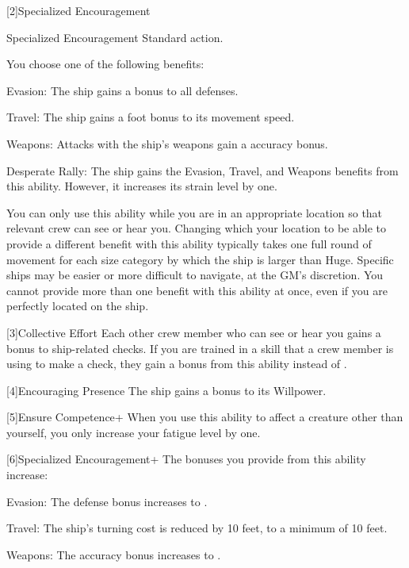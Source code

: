     [2]{Specialized Encouragement}
      \begin{activeability}{Specialized Encouragement}
        \abilityusagetime Standard action.
        \rankline

        You choose one of the following benefits:
        \begin{raggeditemize}
          \item Evasion: The ship  gains a  bonus to all defenses.
          \item Travel: The ship  gains a  foot bonus to its movement speed.
          \item Weapons: Attacks with the ship's weapons  gain a  accuracy bonus.
          \item Desperate Rally: The ship  gains the Evasion, Travel, and Weapons benefits from this ability.
            However, it increases its strain level by one.
        \end{raggeditemize}

        You can only use this ability while you are in an appropriate location so that relevant crew can see or hear you.
        Changing which your location to be able to provide a different benefit with this ability typically takes one full round of movement for each size category by which the ship is larger than Huge.
        Specific ships may be easier or more difficult to navigate, at the GM's discretion.
        You cannot provide more than one benefit with this ability at once, even if you are perfectly located on the ship.
      \end{activeability}

    [3]{Collective Effort} Each other crew member who can see or hear you gains a  bonus to ship-related checks.
      If you are trained in a skill that a crew member is using to make a check, they gain a  bonus from this ability instead of .

    [4]{Encouraging Presence} The ship gains a  bonus to its Willpower.

    [5]{Ensure Competence+} When you use this ability to affect a creature other than yourself, you only increase your fatigue level by one.

    [6]{Specialized Encouragement+} The bonuses you provide from this ability increase:
      \begin{raggeditemize}
        \item Evasion: The defense bonus increases to .
        \item Travel: The ship's turning cost is reduced by 10 feet, to a minimum of 10 feet.
        \item Weapons: The accuracy bonus increases to .
      \end{raggeditemize}

